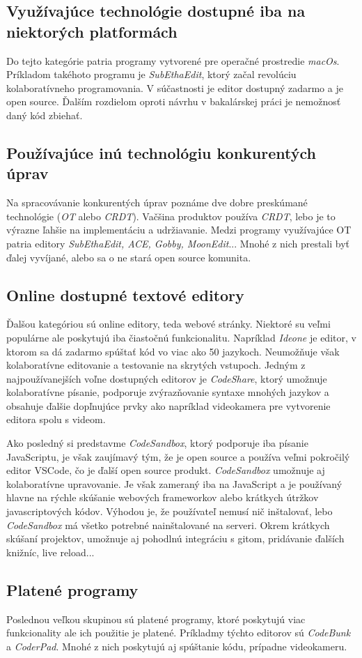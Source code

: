 \subsection{Využívajúce technológie dostupné iba na niektorých platformách}
Do tejto kategórie patria programy vytvorené pre operačné prostredie \textit{macOs}.
Príkladom takéhoto programu je \textit{SubEthaEdit}, ktorý začal revolúciu kolaboratívneho 
programovania. V súčastnosti je editor dostupný zadarmo a je open source. Ďalším rozdielom oproti
návrhu v bakalárskej práci je nemožnosť daný kód zbiehať.

\subsection{Používajúce inú technológiu konkurentých úprav}
Na spracovávanie konkurentých úprav poznáme dve dobre preskúmané technológie (\textit{OT} alebo
\textit{CRDT}). Vačšina produktov používa \textit{CRDT}, lebo je to výrazne ľahšie na implementáciu
a udržiavanie. Medzi programy využívajúce OT patria editory \textit{SubEthaEdit, ACE, Gobby,
MoonEdit}... Mnohé z nich prestali byť ďalej vyvíjané, alebo sa o ne stará open source komunita.

\subsection{Online dostupné textové editory}
Ďalšou kategóriou sú online editory, teda webové stránky. Niektoré su veľmi populárne
ale poskytujú iba čiastočnú funkcionalitu. Napríklad \textit{Ideone} je editor, v ktorom
sa dá zadarmo spúštať kód vo viac ako 50 jazykoch. Neumožňuje však kolaboratívne editovanie
a testovanie na skrytých vstupoch.
Jedným z najpoužívanejších voľne dostupných editorov je \textit{CodeShare}, ktorý umožnuje
kolaboratívne písanie, podporuje zvýrazňovanie syntaxe mnohých jazykov a obsahuje ďalšie 
dopľnujúce prvky ako napríklad videokamera pre vytvorenie editora spolu s videom.

Ako posledný si predstavme \textit{CodeSandbox}, ktorý podporuje iba písanie JavaScriptu, je 
však zaujímavý tým, že je open source a používa veľmi pokročilý editor VSCode, čo je ďalší open
source produkt. \textit{CodeSandbox} umožnuje aj kolaboratívne upravovanie. Je však zameraný iba
na JavaScript a je používaný hlavne na rýchle skúšanie webových frameworkov alebo krátkych
útržkov javascriptových kódov. Výhodou je, že používateľ nemusí nič inštalovať, lebo 
\textit{CodeSandbox} má všetko potrebné nainštalované na serveri. Okrem krátkych skúšaní projektov,
umožnuje aj pohodlnú integráciu s gitom, pridávanie ďalších knižníc, live reload...

\subsection{Platené programy}
Poslednou veľkou skupinou sú platené programy, ktoré poskytujú viac funkcionality ale ich použitie
je platené. Príkladmy týchto editorov sú \textit{CodeBunk} a \textit{CoderPad}. Mnohé z nich
poskytujú aj spúštanie kódu, prípadne videokameru.
